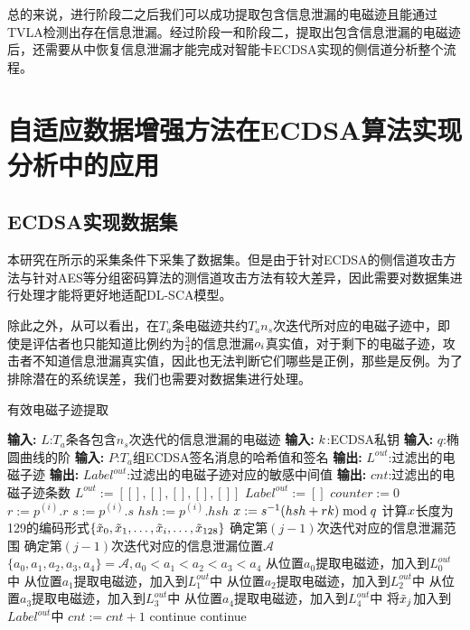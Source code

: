 {	总的来说，进行阶段二之后我们可以成功提取包含信息泄漏的电磁迹且能通过TVLA检测出存在信息泄漏。经过阶段一和阶段二，提取出包含信息泄漏的电磁迹后，还需要从中恢复信息泄漏才能完成对智能卡ECDSA实现的侧信道分析整个流程。
	\section{自适应数据增强方法在ECDSA算法实现分析中的应用}
	\subsection{ECDSA实现数据集}
	本研究在所示的采集条件下采集了数据集。但是由于针对ECDSA的侧信道攻击方法与针对AES等分组密码算法的测信道攻击方法有较大差异，因此需要对数据集进行处理才能将更好地适配DL-SCA模型。
	
	除此之外，从可以看出，在$T_a$条电磁迹共约$T_an_s$次迭代所对应的电磁子迹中，即使是评估者也只能知道比例约为$\frac34$的信息泄漏$o_i$真实值，对于剩下的电磁子迹，攻击者不知道信息泄漏真实值，因此也无法判断它们哪些是正例，那些是反例。为了排除潜在的系统误差，我们也需要对数据集进行处理。
	
	\begin{breakablealgorithm}
		\caption{有效电磁子迹提取}\label{alg:filter}
		\begin{algorithmic}[1]
			\Statex \textbf{输入:} $L$:$T_a$条各包含$n_s$次迭代的信息泄漏的电磁迹
			\Statex \textbf{输入:} $k$:ECDSA私钥
			\Statex \textbf{输入:} $q$:椭圆曲线的阶
			\Statex \textbf{输入:} $P$:$T_a$组ECDSA签名消息的哈希值和签名
			\Statex \textbf{输出:} $L^{out}$:过滤出的电磁子迹
			\Statex \textbf{输出:} $Label^{out}$:过滤出的电磁子迹对应的敏感中间值
			\Statex \textbf{输出:} $cnt$:过滤出的电磁子迹条数
			\State $L^{out}:=\left[ [],[],[],[],[]\right] $
			\State $Label^{out}:=[]$
			\State $counter:=0$
				\State $r:=p^{(i)}.r$
				\State $s:=p^{(i)}.s$
				\State $hsh:=p^{(i)}.hsh$
				\State $x:=s^{-1}(hsh+rk)\bmod q$
				\State 计算$x$长度为129的编码形式$\left\{\tilde{x}_0,\tilde{x}_1,\dots,\tilde{x}_i,\dots, \tilde{x}_{128}\right\}$
						\State 确定第$(j-1)$次迭代对应的信息泄漏范围
						\State 确定第$(j-1)$次迭代对应的信息泄漏位置$\mathcal A$
							\State $\{a_0,a_1,a_2,a_3,a_4\}=\mathcal A,a_0<a_1<a_2<a_3<a_4$
							\State 从位置$a_0$提取电磁迹，加入到$L_0^{out}$中
							\State 从位置$a_1$提取电磁迹，加入到$L_1^{out}$中
							\State 从位置$a_2$提取电磁迹，加入到$L_2^{out}$中
							\State 从位置$a_3$提取电磁迹，加入到$L_3^{out}$中
							\State 从位置$a_4$提取电磁迹，加入到$L_4^{out}$中
							\State 将$\tilde{x}_j$加入到$Label^{out}$中
							\State $cnt:=cnt+1$
						\Else
							\State continue
						\EndIf
					\Else
						\State continue
					\EndIf
				\EndFor
			\EndFor
		\end{algorithmic}
	\end{breakablealgorithm}

}
